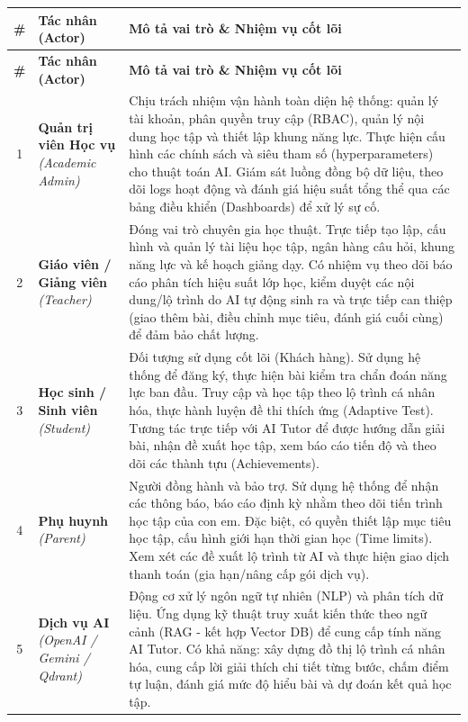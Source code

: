 \documentclass[12pt,a4paper,oneside]{report}
\begin{document}
\renewcommand{\arraystretch}{1.15}
\begin{longtable}{|c|p{3.8cm}|p{9.5cm}|}
\hline
\rowcolor{orange!15}
\textbf{\#} & \textbf{Tác nhân (Actor)} & \textbf{Mô tả vai trò \& Nhiệm vụ cốt lõi} \\
\hline
\endfirsthead
\hline
\rowcolor{orange!15}
\textbf{\#} & \textbf{Tác nhân (Actor)} & \textbf{Mô tả vai trò \& Nhiệm vụ cốt lõi} \\
\hline
\endhead

1 & \textbf{Quản trị viên Học vụ} \newline \textit{(Academic Admin)} & Chịu trách nhiệm vận hành toàn diện hệ thống: quản lý tài khoản, phân quyền truy cập (RBAC), quản lý nội dung học tập và thiết lập khung năng lực. Thực hiện cấu hình các chính sách và siêu tham số (hyperparameters) cho thuật toán AI. Giám sát luồng đồng bộ dữ liệu, theo dõi logs hoạt động và đánh giá hiệu suất tổng thể qua các bảng điều khiển (Dashboards) để xử lý sự cố. \\ \hline
2 & \textbf{Giáo viên / Giảng viên} \newline \textit{(Teacher)} & Đóng vai trò chuyên gia học thuật. Trực tiếp tạo lập, cấu hình và quản lý tài liệu học tập, ngân hàng câu hỏi, khung năng lực và kế hoạch giảng dạy. Có nhiệm vụ theo dõi báo cáo phân tích hiệu suất lớp học, kiểm duyệt các nội dung/lộ trình do AI tự động sinh ra và trực tiếp can thiệp (giao thêm bài, điều chỉnh mục tiêu, đánh giá cuối cùng) để đảm bảo chất lượng. \\ \hline
3 & \textbf{Học sinh / Sinh viên} \newline \textit{(Student)} & Đối tượng sử dụng cốt lõi (Khách hàng). Sử dụng hệ thống để đăng ký, thực hiện bài kiểm tra chẩn đoán năng lực ban đầu. Truy cập và học tập theo lộ trình cá nhân hóa, thực hành luyện đề thi thích ứng (Adaptive Test). Tương tác trực tiếp với AI Tutor để được hướng dẫn giải bài, nhận đề xuất học tập, xem báo cáo tiến độ và theo dõi các thành tựu (Achievements). \\ \hline
4 & \textbf{Phụ huynh} \newline \textit{(Parent)} & Người đồng hành và bảo trợ. Sử dụng hệ thống để nhận các thông báo, báo cáo định kỳ nhằm theo dõi tiến trình học tập của con em. Đặc biệt, có quyền thiết lập mục tiêu học tập, cấu hình giới hạn thời gian học (Time limits). Xem xét các đề xuất lộ trình từ AI và thực hiện giao dịch thanh toán (gia hạn/nâng cấp gói dịch vụ). \\ \hline
5 & \textbf{Dịch vụ AI} \newline \textit{(OpenAI / Gemini / Qdrant)} & Động cơ xử lý ngôn ngữ tự nhiên (NLP) và phân tích dữ liệu. Ứng dụng kỹ thuật truy xuất kiến thức theo ngữ cảnh (RAG - kết hợp Vector DB) để cung cấp tính năng AI Tutor. Có khả năng: xây dựng đồ thị lộ trình cá nhân hóa, cung cấp lời giải thích chi tiết từng bước, chấm điểm tự luận, đánh giá mức độ hiểu bài và dự đoán kết quả học tập. \\ \hline

\end{longtable}
\end{document}
